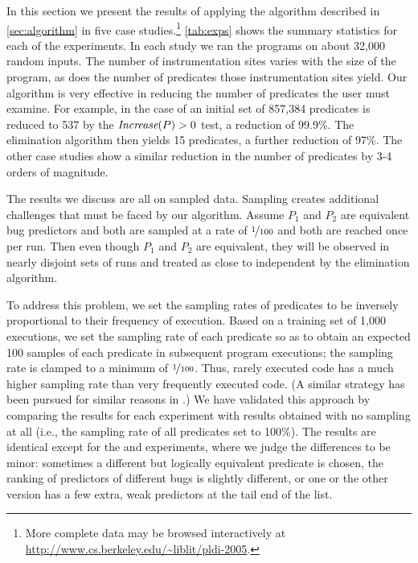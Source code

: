 


In this section we present the results of applying the algorithm
described in \autoref{sec:algorithm} in five case
studies.\footnote{More complete data may be browsed interactively at
  \url{http://www.cs.berkeley.edu/~liblit/pldi-2005}.}
\autoref{tab:exps} shows the summary statistics for each of the
experiments.  In each study we ran the programs on about 32,000 random
inputs.  The number of instrumentation sites varies with the size of
the program, as does the number of predicates those instrumentation
sites yield.  Our algorithm is very effective in reducing the number
of predicates the user must examine.  For example, in the case of
\rhythmbox an initial set of 857,384 predicates is reduced to 537 by the $\textit{Increase}(P) > 0$
test, a reduction of 99.9\%.  The elimination algorithm then yields 15 predicates, a further
reduction of 97\%.  The other case studies show a similar reduction in the number of
predicates by 3-4 orders of magnitude.

The results we discuss are all on sampled data.  Sampling creates
additional challenges that must be faced by our algorithm.  Assume $P_1$ and $P_2$ are
equivalent bug predictors and both are sampled at a rate of
$\nicefrac{1}{100}$ and both are reached once per run.  Then even though
$P_1$ and $P_2$ are equivalent, they will be observed in nearly disjoint
sets of runs and treated as close to independent by the elimination
algorithm.

To address this problem, we set the sampling rates of predicates to be
inversely proportional to their frequency of execution.  Based on a
training set of 1,000 executions, we set the sampling rate of each predicate so 
as to obtain an expected 100 samples of each predicate in subsequent program 
executions; the sampling rate is clamped to a minimum of $\nicefrac{1}{100}$.  
Thus, rarely executed code has a
much higher sampling rate than very frequently executed code.  (A
similar strategy has been pursued for similar reasons in \cite{chil04}.)  We
have validated this approach by comparing the results for each
experiment with results obtained with no sampling at all (i.e., the
sampling rate of all predicates set to 100\%).  The results are
identical except for the \rhythmbox and \moss experiments, where we
judge the differences to be minor: sometimes a different but logically
equivalent predicate is chosen, the ranking of predictors of different
bugs is slightly different, or one or the other version has a few
extra, weak predictors at the tail end of the list.  

